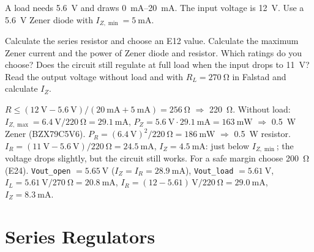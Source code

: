 A load needs \SI{5.6}{\volt} and draws \SIrange{0}{20}{\milli\ampere}. The input voltage is \SI{12}{\volt}.
Use a \SI{5.6}{\volt} Zener diode with $I_{Z,\min}=\SI{5}{\milli\ampere}$.
\begin{talist}
\ta Calculate the series resistor and choose an E12 value.
\ta Calculate the maximum Zener current and the power of Zener diode and resistor. Which ratings do you choose?
\ta Does the circuit still regulate at full load when the input drops to \SI{11}{\volt}?
\ta Read the output voltage without load and with $R_L=\SI{270}{\ohm}$ in Falstad and calculate $I_Z$.
\end{talist}

\begin{solution}
\begin{talist}
\ta $R \le (\SI{12}{\volt}-\SI{5.6}{\volt})/(\SI{20}{\milli\ampere}+\SI{5}{\milli\ampere}) = \SI{256}{\ohm}$ $\Rightarrow$ \SI{220}{\ohm}.
\ta Without load: $I_{Z,\max} = \SI{6.4}{\volt}/\SI{220}{\ohm} = \SI{29.1}{\milli\ampere}$,
    $P_Z = \SI{5.6}{\volt}\cdot\SI{29.1}{\milli\ampere} = \SI{163}{\milli\watt}$ $\Rightarrow$ \SI{0.5}{\watt} Zener (BZX79C5V6).
    $P_R = (\SI{6.4}{\volt})^2/\SI{220}{\ohm} = \SI{186}{\milli\watt}$ $\Rightarrow$ \SI{0.5}{\watt} resistor.
\ta $I_R = (\SI{11}{\volt}-\SI{5.6}{\volt})/\SI{220}{\ohm} = \SI{24.5}{\milli\ampere}$, $I_Z = \SI{4.5}{\milli\ampere}$:
    just below $I_{Z,\min}$; the voltage drops slightly, but the circuit still works. For a safe margin choose \SI{200}{\ohm} (E24).
\ta {}\newline \texttt{Vout\_open} $=\SI{5.65}{\volt}$ ($I_Z = I_R = \SI{28.9}{\milli\ampere}$),
    \texttt{Vout\_load} $=\SI{5.61}{\volt}$,\newline $I_L = \SI{5.61}{\volt}/\SI{270}{\ohm} = \SI{20.8}{\milli\ampere}$,
    $I_R = (12-5.61)\,\si{\volt}/\SI{220}{\ohm} = \SI{29.0}{\milli\ampere}$, $I_Z = \SI{8.3}{\milli\ampere}$.
\end{talist}
\end{solution}

\section{Series Regulators}\label{sec:sources-series}

